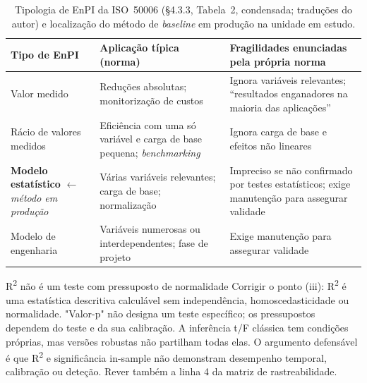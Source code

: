 \begin{table}[htbp]
  \centering\small
  \caption[Tipologia de EnPI da ISO 50006 e localização do método em produção]{Tipologia de EnPI da ISO~50006 (\S4.3.3, Tabela~2, condensada; traduções do autor) e localização do método de \emph{baseline} em produção na unidade em estudo.}
  \label{tab:tipologia-enpi}
  \begin{tabularx}{\textwidth}{@{}l X X@{}}
    \toprule
    \textbf{Tipo de EnPI} & \textbf{Aplicação típica (norma)} & \textbf{Fragilidades enunciadas pela própria norma} \\
    \midrule
    Valor medido & Reduções absolutas; monitorização de custos & Ignora variáveis relevantes; \enquote{resultados enganadores na maioria das aplicações} \\
    Rácio de valores medidos & Eficiência com uma só variável e carga de base pequena; \emph{benchmarking} & Ignora carga de base e efeitos não lineares \\
    \textbf{Modelo estatístico} $\leftarrow$ \emph{método em produção} & Várias variáveis relevantes; carga de base; normalização & Impreciso se não confirmado por testes estatísticos; exige manutenção para assegurar validade \\
    Modelo de engenharia & Variáveis numerosas ou interdependentes; fase de projeto & Exige manutenção para assegurar validade \\
    \bottomrule
  \end{tabularx}
\end{table}

{R\textsuperscript{2} não é um teste com pressuposto de normalidade}
{Corrigir o ponto (iii): R\textsuperscript{2} é uma estatística descritiva calculável sem
independência, homoscedasticidade ou normalidade. "Valor-p" não designa um
teste específico; os pressupostos dependem do teste e da sua calibração.
A inferência t/F clássica tem condições próprias, mas versões robustas
não partilham todas elas. O argumento defensável é que R\textsuperscript{2} e significância
in-sample não demonstram desempenho temporal, calibração ou deteção.
Rever também a linha 4 da matriz de rastreabilidade.}%
